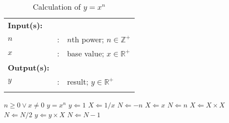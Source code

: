 \begin{table}[!htbp]
	\caption{Calculation of $y = x^n$}
	\label{tab:calcxn}
	{\footnotesize
		\begin{tabular}{lll}
			\hline
			\hline
			{\bfseries Input(s):}  &   &                                     \\
			$n$                    & : & $n$th power; $n \in \mathbb{Z}^{+}$ \\
			$x$                    & : & base value; $x \in \mathbb{R}^{+}$  \\
			\hline
			{\bfseries Output(s):} &   &                                     \\
			$y$                    & : & result; $y \in \mathbb{R}^{+}$      \\
			\hline
			\hline
			\\
		\end{tabular}
	}
	\begin{algorithmic}[1]
		{\footnotesize
			\REQUIRE $n \geq 0 \vee x \neq 0$
			\ENSURE $y = x^n$
			\STATE $y \Leftarrow 1$
			\STATE $X \Leftarrow 1 / x$
			\STATE $N \Leftarrow -n$
			\ELSE
			\STATE $X \Leftarrow x$
			\STATE $N \Leftarrow n$
			\ENDIF
			\STATE $X \Leftarrow X \times X$
			\STATE $N \Leftarrow N / 2$
			\ELSE[$N$ is odd]
			\STATE $y \Leftarrow y \times X$
			\STATE $N \Leftarrow N - 1$
			\ENDIF
			\ENDWHILE
		}
	\end{algorithmic}
\end{table}
\cleardoublepage




